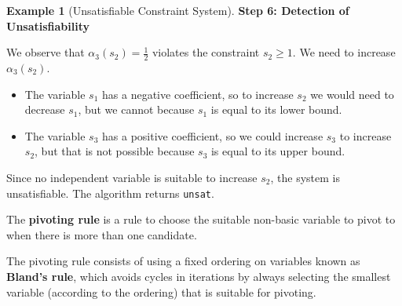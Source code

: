 \documentclass[11pt,a4paper]{article}
\theoremstyle{definition}
\newtheorem{example}{Example}[section]
\theoremstyle{plain}
\theoremstyle{remark}
\begin{document}
\begin{example}[Unsatisfiable Constraint System]
    \textbf{Step 6: Detection of Unsatisfiability}
    
    We observe that $\alpha_3(s_2) = \frac{1}{2}$ violates the constraint $s_2 \geq 1$. We need to increase $\alpha_3(s_2)$. 
    \begin{itemize}
        \item The variable $s_1$ has a negative coefficient, so to increase $s_2$ we would need to decrease $s_1$, but we cannot because $s_1$ is equal to its lower bound.
        \item The variable $s_3$ has a positive coefficient, so we could increase $s_3$ to increase $s_2$, but that is not possible because $s_3$ is equal to its upper bound.
    \end{itemize}
    
    Since no independent variable is suitable to increase $s_2$, the system is unsatisfiable. The algorithm returns \texttt{unsat}.
\end{example}

\begin{tcolorbox}[colback=yellow!10!white,colframe=yellow!75!black,title=\textbf{Pivoting Rule}]
The \textbf{pivoting rule} is a rule to choose the suitable non-basic variable to pivot to when there is more than one candidate.

The pivoting rule consists of using a fixed ordering on variables known as \textbf{Bland's rule}, which avoids cycles in iterations by always selecting the smallest variable (according to the ordering) that is suitable for pivoting.
\end{tcolorbox}
\end{document}
